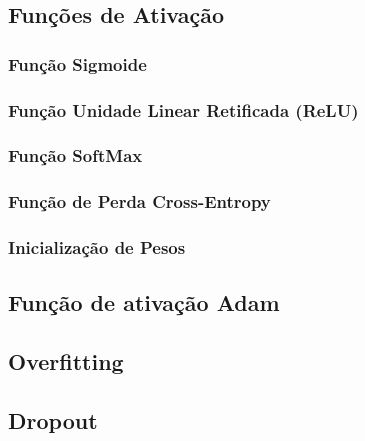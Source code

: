 \subsection{Funções de Ativação}
\subsubsection{Função Sigmoide}
\subsubsection{Função Unidade Linear Retificada (ReLU)}
\subsubsection{Função SoftMax}
\subsubsection{Função de Perda Cross-Entropy}
\subsubsection{Inicialização de Pesos}
\subsection{Função de ativação Adam}
\subsection{Overfitting}
\subsection{Dropout}

